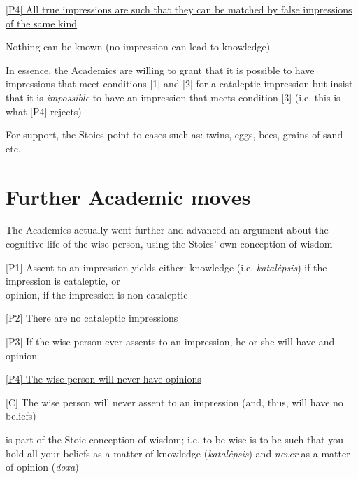 \documentclass[11pt]{article}
\begin{document}
\noindent\underline{[P4] All true impressions are such that they can be matched by false impressions of the same kind}
\vspace*{1mm}

\noindent [C] Nothing can be known (no impression can lead to knowledge)
\vspace*{2mm}

\noindent In essence, the Academics are willing to grant that it is possible to have impressions that meet conditions [1] and [2] for a cataleptic impression but insist that it is \emph{impossible} to have an impression that meets condition [3] (i.e. this is what [P4] rejects)
\vspace*{2mm}

\noindent For support, the Stoics point to cases such as: twins, eggs, bees, grains of sand etc.
\vspace*{2mm}

\section*{Further Academic moves}

\noindent The Academics actually went further and advanced an argument about the cognitive life of the wise person, using the Stoics' own conception of wisdom
\vspace*{2mm}

[P1] Assent to an impression yields either: knowledge (i.e. \emph{katal\^{e}psis}) if the impression is cataleptic, or\\\hspace*{13mm}opinion, if the impression is non-cataleptic
\vspace*{1mm}

[P2] There are no cataleptic impressions
\vspace*{1mm}

[P3] If the wise person ever assents to an impression, he or she will have and opinion
\vspace*{1mm}

\underline{[P4] The wise person will never have opinions}
\vspace*{1mm}

[C] The wise person will never assent to an impression (and, thus, will have no beliefs)
\vspace*{2mm}

\noindent [P4] is part of the Stoic conception of wisdom; i.e. to be wise is to be such that you hold all your beliefs as a matter of knowledge (\emph{katal\^{e}psis}) and \emph{never} as a matter of opinion (\emph{doxa})
\vspace*{2mm}
\end{document}
